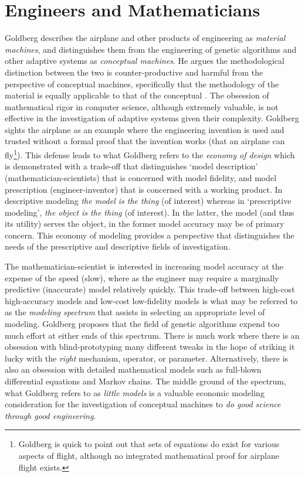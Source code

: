 \documentclass[a4paper, 11pt]{article}
\begin{document}
\section{Engineers and Mathematicians}
\label{sub:engineers}
Goldberg describes the airplane and other products of engineering as \emph{material machines}, and distinguishes them from the engineering of genetic algorithms and other adaptive systems as \emph{conceptual machines}. He argues the methodological distinction between the two is counter-productive and harmful from the perspective of conceptual machines, specifically that the methodology of the material is equally applicable to that of the conceptual \cite{Goldberg1999a}. The obsession of mathematical rigor in computer science, although extremely valuable, is not effective in the investigation of adaptive systems given their complexity. Goldberg sights the airplane as an example where the engineering invention is used and trusted without a formal proof that the invention works (that an airplane can fly\footnote{Goldberg is quick to point out that sets of equations do exist for various aspects of flight, although no integrated mathematical proof for airplane flight exists.}). This defense leads to what Goldberg refers to the \emph{economy of design} which is demonstrated with a trade-off that distinguishes `model description' (mathematician-scientists) that is concerned with model fidelity, and model prescription (engineer-inventor) that is concerned with a working product. In descriptive modeling \emph{the model is the thing} (of interest) whereas in `prescriptive modeling', \emph{the object is the thing} (of interest). In the latter, the model (and thus its utility) serves the object, in the former model accuracy may be of primary concern. This economy of modeling provides a perspective that distinguishes the needs of the prescriptive and descriptive fields of investigation. 

The mathematician-scientist is interested in increasing model accuracy at the expense of the speed (slow), where as the engineer may require a marginally predictive (inaccurate) model relatively quickly. This trade-off between high-cost high-accuracy models and low-cost low-fidelity models is what may be referred to as the \emph{modeling spectrum} that assists in selecting an appropriate level of modeling. Goldberg proposes that the field of genetic algorithms expend too much effort at either ends of this spectrum. There is much work where there is an obsession with blind-prototyping many different tweaks in the hope of striking it lucky with the \emph{right} mechanism, operator, or parameter. Alternatively, there is also an obsession with detailed mathematical models such as full-blown differential equations and Markov chains. The middle ground of the spectrum, what Goldberg refers to as \emph{little models} is a valuable economic modeling consideration for the investigation of conceptual machines to \emph{do good science through good engineering}. 
\end{document}
